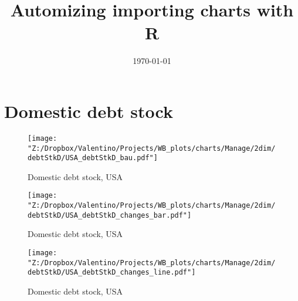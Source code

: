 \documentclass[12pt, letterpaper]{article}
\title{Automizing importing charts with R}
\date{\today}
\begin{document}
\maketitle
\listoffigures
\tableofcontents

\newpage
\section{Domestic debt stock}
\begin{figure}[H]
\caption{Domestic debt stock, USA}
\label{fig_USA_debtStkD_bau}
\centering
\texttt{[image: "Z:/Dropbox/Valentino/Projects/WB\_plots/charts/Manage/2dim/debtStkD/USA\_debtStkD\_bau.pdf"]}
\end{figure}
\begin{figure}[H]
\caption{Domestic debt stock, USA}
\label{fig_USA_debtStkD_changes_bar}
\centering
\texttt{[image: "Z:/Dropbox/Valentino/Projects/WB\_plots/charts/Manage/2dim/debtStkD/USA\_debtStkD\_changes\_bar.pdf"]}
\end{figure}
\begin{figure}[H]
\caption{Domestic debt stock, USA}
\label{fig_USA_debtStkD_changes_line}
\centering
\texttt{[image: "Z:/Dropbox/Valentino/Projects/WB\_plots/charts/Manage/2dim/debtStkD/USA\_debtStkD\_changes\_line.pdf"]}
\end{figure}

\newpage
\end{document}
